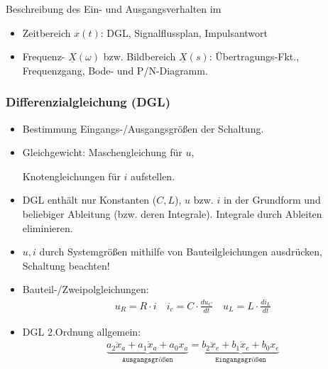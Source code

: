 Beschreibung des Ein- und Ausgangsverhalten im
\begin{itemize}
	\item Zeitbereich $x(t)$: DGL, Signalflussplan, Impulsantwort
	\item Frequenz- $\underline{X}(\omega)$ bzw. Bildbereich $\underline{X}(s)$: Übertragungs-Fkt., Frequenzgang, Bode- und P/N-Diagramm.
\end{itemize}
\subsubsection{Differenzialgleichung (DGL)}
\begin{itemize}
	\small
	\item Bestimmung Eingangs-/Ausgangsgr\"o\ss en der Schaltung.
	\item Gleichgewicht: Maschengleichung für $u$,\par Knotengleichungen f\"ur $i$ aufstellen.
	\item DGL enth\"alt nur Konstanten ($C,L$), $u$ bzw. $i$ in der Grundform und beliebiger Ableitung (bzw. deren Integrale). Integrale durch Ableiten eliminieren.
	\item $u,i$ durch Systemgr\"o\ss en mithilfe von Bauteilgleichungen ausdr\"ucken, Schaltung beachten!
	\normalsize
	\item Bauteil-/Zweipolgleichungen:
	\begin{gather*}
		u_R = R \cdot i \quad \boxed{i_c = C \cdot \frac{du_C}{dt}} \quad \boxed{u_L = L \cdot \frac{di_L}{dt}}
	\end{gather*}
	\item DGL 2.Ordnung allgemein:
\begin{gather*}
		\underbrace{a_2 \ddot{x}_a + a_1 \dot{x}_a + a_0 x_a}_{\texttt{Ausgangsgr\"o\ss en}} = \underbrace{b_2 \ddot{x}_e + b_1 \dot{x}_e + b_0 x_e}_{\texttt{Eingangsgr\"o\ss en}}
\end{gather*}
\end{itemize}

